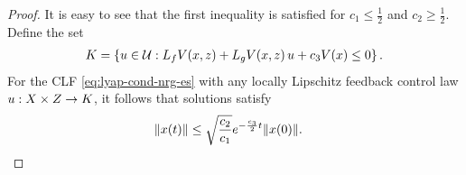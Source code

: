 \documentclass[twocolumn]{article}
\begin{document}
\begin{proof}
  It is easy to see that the first inequality is satisfied for $c_{1} \leq \frac{1}{2}$ and $c_{2} \geq \frac{1}{2}$.
  Define the set
  \begin{align}
    K = \left\{ u \in \mathcal{U} : L_{f} V(x, z) + L_{g} V(x, z) \, u + c_{3} V(x) \leq 0 \right\}.
    \label{eq:control-set}
  \end{align}
  For the CLF \eqref{eq:lyap-cond-nrg-es} with any locally Lipschitz feedback control law $u : X \times Z \to K$, it follows that solutions satisfy
  \begin{align*}
    \| x(t) \| \leq \sqrt{\frac{c_{2}}{c_{1}}} e^{-\frac{c_{3}}{2} t} \| x(0) \|. & \qedhere
  \end{align*}
  
\end{proof}
\end{document}
